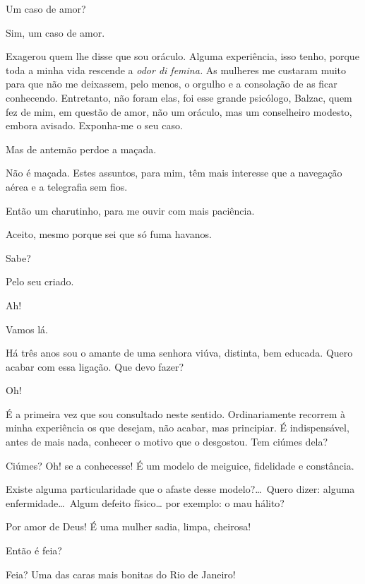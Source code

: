   Um caso de amor?

  Sim, um caso de amor.

  Exagerou quem lhe disse que sou oráculo. Alguma
experiência, isso tenho, porque toda a minha vida rescende a
\textit{odor di femina.} As mulheres me custaram muito para que não me
deixassem, pelo menos, o orgulho e a consolação de as ficar conhecendo.
Entretanto, não foram elas, foi esse grande psicólogo, Balzac, quem fez
de mim, em questão de amor, não um oráculo, mas um conselheiro modesto,
embora avisado. Exponha{}-me o seu caso.

  Mas de antemão perdoe a maçada.

  Não é maçada. Estes assuntos, para mim, têm mais
interesse que a navegação aérea e a telegrafia sem fios.

  Então um charutinho, para me ouvir com mais
paciência. 

   Aceito, mesmo porque sei que
só fuma havanos.

  Sabe?

  Pelo seu criado.

  Ah! 

  Vamos lá.

  Há três anos sou o amante de uma senhora
viúva, distinta, bem educada. Quero acabar com essa ligação. Que devo
fazer?

  Oh!

  É a primeira vez que sou consultado neste sentido.
Ordinariamente recorrem à minha experiência os que desejam, não acabar,
mas principiar. É indispensável, antes de mais nada, conhecer o motivo
que o desgostou. Tem ciúmes dela?

  Ciúmes? Oh! se a conhecesse! É um modelo de
meiguice, fidelidade e constância.

  Existe alguma particularidade que o afaste desse
modelo?\ldots\ Quero dizer: alguma enfermidade\ldots\ Algum defeito físico\ldots
por exemplo: o mau hálito?

  Por amor de Deus! É uma mulher sadia, limpa,
cheirosa!

  Então é feia?

  Feia? Uma das caras mais bonitas do Rio de
Janeiro!

